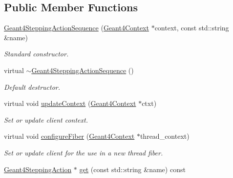 \subsection*{Public Member Functions}
\begin{DoxyCompactItemize}
\item 
\hyperlink{class_d_d4hep_1_1_simulation_1_1_geant4_stepping_action_sequence_ad87447c0f76a0e4fb5f294c1c4117432}{Geant4SteppingActionSequence} (\hyperlink{class_d_d4hep_1_1_simulation_1_1_geant4_context}{Geant4Context} $\ast$context, const std::string \&name)
\begin{DoxyCompactList}\small\item\em Standard constructor. \item\end{DoxyCompactList}\item 
virtual \hyperlink{class_d_d4hep_1_1_simulation_1_1_geant4_stepping_action_sequence_a7b7b346f45f9194e6aec6eafdde18448}{$\sim$Geant4SteppingActionSequence} ()
\begin{DoxyCompactList}\small\item\em Default destructor. \item\end{DoxyCompactList}\item 
virtual void \hyperlink{class_d_d4hep_1_1_simulation_1_1_geant4_stepping_action_sequence_aababd8e6f650101a6ade162f82a29f61}{updateContext} (\hyperlink{class_d_d4hep_1_1_simulation_1_1_geant4_context}{Geant4Context} $\ast$ctxt)
\begin{DoxyCompactList}\small\item\em Set or update client context. \item\end{DoxyCompactList}\item 
virtual void \hyperlink{class_d_d4hep_1_1_simulation_1_1_geant4_stepping_action_sequence_ad5680d2d225421b9cf2cd6b530d3ab5f}{configureFiber} (\hyperlink{class_d_d4hep_1_1_simulation_1_1_geant4_context}{Geant4Context} $\ast$thread\_\-context)
\begin{DoxyCompactList}\small\item\em Set or update client for the use in a new thread fiber. \item\end{DoxyCompactList}\item 
\hyperlink{class_d_d4hep_1_1_simulation_1_1_geant4_stepping_action}{Geant4SteppingAction} $\ast$ \hyperlink{class_d_d4hep_1_1_simulation_1_1_geant4_stepping_action_sequence_a4295188144ad3820c331056a143af5d1}{get} (const std::string \&name) const 

\end{DoxyCompactItemize}
